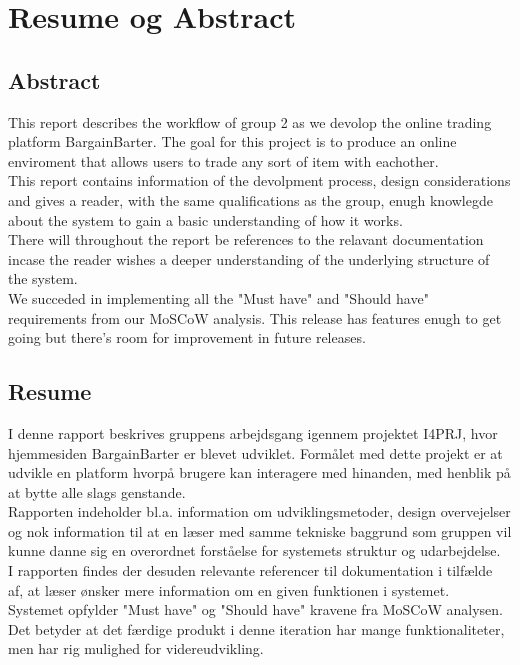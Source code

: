 \chapter{Resume og Abstract}

\section{Abstract}
This report describes the workflow of group 2 as we devolop the online trading platform BargainBarter. The goal for this project is to produce an online enviroment that allows users to trade any sort of item with eachother. 
\\This report contains information of the devolpment process, design considerations and gives a reader, with the same qualifications as the group, enugh knowlegde about the system to gain a basic understanding of how it works. 
\\There will throughout the report be references to the relavant documentation incase the reader wishes a deeper understanding of the underlying structure of the system.
\\We succeded in implementing all the "Must have" and "Should have" requirements from our MoSCoW analysis. This release has features enugh to get going but there's room for improvement in future releases.

\section{Resume}

I denne rapport beskrives gruppens arbejdsgang igennem projektet I4PRJ, hvor hjemmesiden BargainBarter er blevet udviklet. Formålet med dette projekt er at udvikle en platform hvorpå brugere kan interagere med hinanden, med henblik på at bytte alle slags genstande.
\\Rapporten indeholder bl.a. information om udviklingsmetoder, design overvejelser og nok information til at en læser med samme tekniske baggrund som gruppen vil kunne danne sig en overordnet forståelse for systemets struktur og udarbejdelse. 
\\I rapporten findes der desuden relevante referencer til dokumentation i tilfælde af, at læser ønsker mere information om en given funktionen i systemet. 
\\Systemet opfylder "Must have" og "Should have" kravene fra MoSCoW analysen. Det betyder at det færdige produkt i denne iteration har mange funktionaliteter, men har rig mulighed for videreudvikling. 
